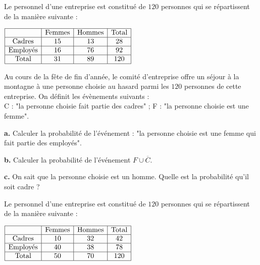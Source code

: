 {\begin{Exercice}
\begin{minipage}[t]{\linewidth}Le personnel d'une entreprise est constitué de $120$ personnes qui se répartissent de
          la manière suivante :  \\
\begin{center}
            $\renewcommand{\arraystretch}{1}
\begin{array}{|c|c|c|c|}
\hline
   &   \text{Femmes} &   \text{Hommes} &   \text{Total}\\
\hline
  \text{Cadres} & 15 & 13 & 28\\
\hline
  \text{Employés} & 16 & 76 & 92\\
\hline
  \text{Total} & 31 & 89 & 120\\
\hline
\end{array}
\renewcommand{\arraystretch}{1}$
\end{center}

Au cours de la fête de fin d'année, le comité d'entreprise offre un séjour à la
montagne à une personne choisie au hasard parmi les $120$ personnes de cette
entreprise. On définit les évènements suivants : \\
C : "la personne choisie fait partie des cadres" ;
               F :  "la personne choisie est une femme".

\medskip
\textbf {a.}   Calculer la probabilité de l'événement :  "la personne choisie est une femme qui fait partie des employés".

\medskip
\textbf {b.}   Calculer la probabilité de l'événement $F\cup \overline{C}$.

\medskip
\textbf {c.}   On sait que la personne choisie  est un homme. Quelle est la probabilité qu'il soit cadre ?
\end{minipage}

\end{Exercice}

\begin{Exercice} 
\begin{minipage}[t]{\linewidth}Le personnel d'une entreprise est constitué de $120$ personnes qui se répartissent de
          la manière suivante :  \\
\begin{center}
            $\renewcommand{\arraystretch}{1}
\begin{array}{|c|c|c|c|}
\hline
   &   \text{Femmes} &   \text{Hommes} &   \text{Total}\\
\hline
  \text{Cadres} & 10 & 32 & 42\\
\hline
  \text{Employés} & 40 & 38 & 78\\
\hline
  \text{Total} & 50 & 70 & 120\\
\hline
\end{array}
\renewcommand{\arraystretch}{1}$
\end{center}


\end{minipage}
\end{Exercice}}
